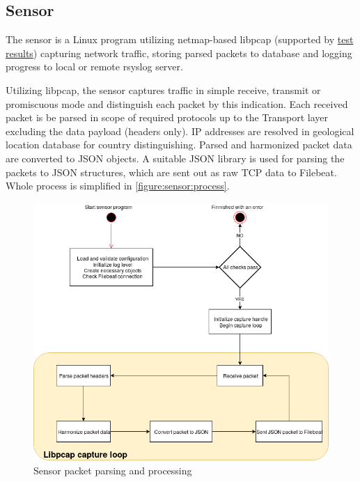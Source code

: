 \documentclass[12pt,a4paper,twoside]{report}
\begin{document}
		\subsection{Sensor} \label{solution:design:sensor}
			The sensor is a Linux program utilizing netmap-based libpcap (supported by \hyperref[analysis:testing:results]{test results}) capturing network traffic, storing parsed packets to database and logging progress to local or remote rsyslog server.\par
			Utilizing libpcap, the sensor captures traffic in simple receive, transmit or promiscuous mode and distinguish each packet by this indication. Each received packet is be parsed in scope of required protocols up to the Transport layer excluding the data payload (headers only). IP addresses are resolved in geological location database for country distinguishing. Parsed and harmonized packet data are converted to JSON objects. A suitable JSON library is used for parsing the packets to JSON structures, which are sent out as raw TCP data to Filebeat. Whole process is simplified in \autoref{figure:sensor:process}.
				\begin{figure}[h]
					\centering
					\includegraphics[scale=0.35]{sensor_process}
					\caption{Sensor packet parsing and processing}
					\label{figure:sensor:process}
				\end{figure}
\end{document}
